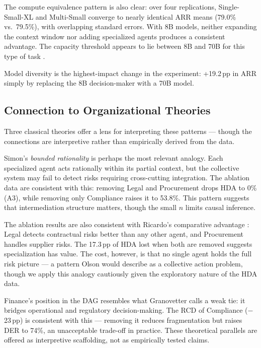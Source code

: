 \documentclass[preprint,12pt,numrefs]{elsarticle}
\begin{document}
The compute equivalence pattern is also clear: over four replications,
Single-Small-XL and Multi-Small converge to nearly identical ARR means
(79.0\% vs.\ 79.5\%), with overlapping standard errors. With 8B models,
neither expanding the context window nor adding specialized agents
produces a consistent advantage. The capacity threshold appears to lie
between 8B and 70B for this type of task \citep{Li2024moreagents}.

Model diversity is the highest-impact change in the experiment:
+19.2\,pp in ARR simply by replacing the 8B decision-maker with a 70B
model.

\subsection{Connection to Organizational Theories}


Three classical theories offer a lens for interpreting these 
patterns --- though the connections are interpretive rather 
than empirically derived from the data.

Simon's \emph{bounded rationality} \citep{simon1955rational} 
is perhaps the most relevant analogy. Each specialized agent 
acts rationally within its partial context, but the collective 
system may fail to detect risks requiring cross-cutting 
integration. The ablation data are consistent with this: 
removing Legal and Procurement drops HDA to 0\% (A3), while 
removing only Compliance raises it to 53.8\%. This pattern 
suggests that intermediation structure matters, though the 
small $n$ limits causal inference.

The ablation results are also consistent with Ricardo's comparative 
advantage \citep{ricardo1817}: Legal detects contractual risks better 
than any other agent, and Procurement handles supplier risks. The 
17.3\,pp of HDA lost when both are removed suggests specialization 
has value. The cost, however, is that no single agent holds the full 
risk picture --- a pattern Olson \citep{olson1965} would describe as 
a collective action problem, though we apply this analogy cautiously 
given the exploratory nature of the HDA data.

Finance's position in the DAG resembles what Granovetter 
\citep{granovetter1973} calls a weak tie: it bridges operational 
and regulatory decision-making. The RCD of Compliance ($-$23\,pp) 
is consistent with this --- removing it reduces fragmentation but 
raises DER to 74\%, an unacceptable trade-off in practice. These 
theoretical parallels are offered as interpretive scaffolding, 
not as empirically tested claims.
\end{document}
